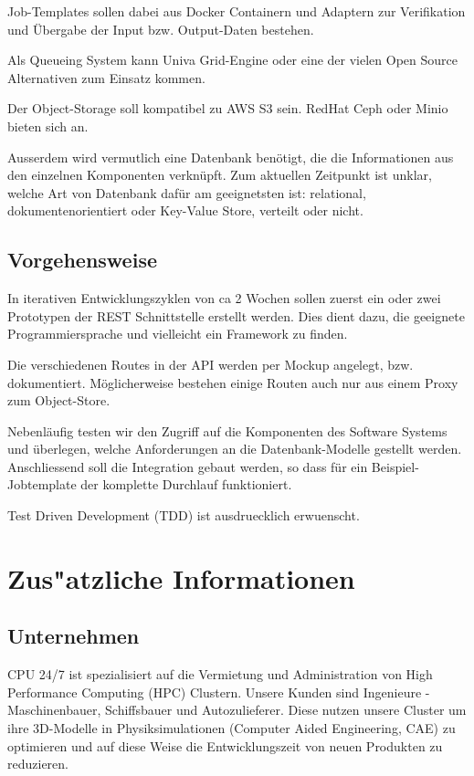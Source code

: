 \documentclass[12pt]{article}
\begin{document}
Job-Templates sollen dabei aus Docker Containern und Adaptern zur Verifikation und Übergabe der Input bzw. Output-Daten bestehen.

Als Queueing System kann Univa Grid-Engine oder eine der vielen Open Source Alternativen zum Einsatz kommen.

Der Object-Storage soll kompatibel zu AWS S3 sein. RedHat Ceph oder Minio bieten sich an.

Ausserdem wird vermutlich eine Datenbank benötigt, die die Informationen aus den einzelnen Komponenten verknüpft. Zum aktuellen Zeitpunkt ist unklar, welche Art von Datenbank dafür am geeignetsten ist: relational, dokumentenorientiert oder Key-Value Store, verteilt oder nicht.

\subsection{Vorgehensweise}

In iterativen Entwicklungszyklen von ca 2 Wochen sollen zuerst ein oder zwei Prototypen der REST Schnittstelle erstellt werden. Dies dient dazu, die geeignete Programmiersprache und vielleicht ein Framework zu finden.

Die verschiedenen Routes in der API werden per Mockup angelegt, bzw. dokumentiert. Möglicherweise bestehen einige Routen auch nur aus einem Proxy zum Object-Store.

Nebenläufig testen wir den Zugriff auf die Komponenten des Software Systems und überlegen, welche Anforderungen an die Datenbank-Modelle gestellt werden. Anschliessend soll die Integration gebaut werden, so dass für ein Beispiel-Jobtemplate der komplette Durchlauf funktioniert.

Test Driven Development (TDD) ist ausdruecklich erwuenscht.
\newpage

\section{Zus"atzliche Informationen}
\subsection{Unternehmen}

CPU 24/7 ist spezialisiert auf die Vermietung und Administration
von High Performance Computing (HPC) Clustern.
Unsere Kunden sind Ingenieure - Maschinenbauer, Schiffsbauer und Autozulieferer.
Diese nutzen unsere Cluster um ihre 3D-Modelle in Physiksimulationen (Computer Aided Engineering, CAE)
zu optimieren und auf diese Weise die Entwicklungszeit von neuen Produkten zu reduzieren.
\end{document}
